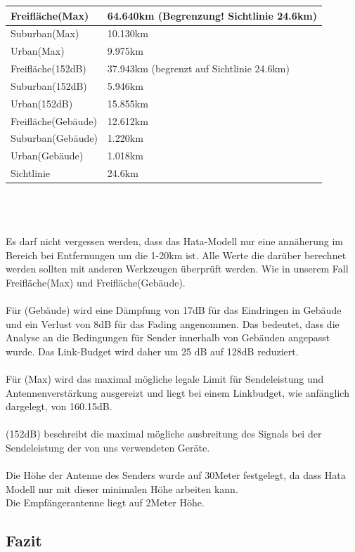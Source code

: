 \documentclass[12pt,a4paper]{article}
\begin{document}
\begin{tabular}[h]{l | l}
Freifläche(Max)  & 64.640km (Begrenzung! Sichtlinie 24.6km) \\
\hline
Suburban(Max) & 10.130km \\
\hline
Urban(Max) & 9.975km\\
\hline
\hline
\hline
Freifläche(152dB) & 37.943km (begrenzt auf Sichtlinie 24.6km) \\
\hline
Suburban(152dB) & 5.946km \\
\hline
Urban(152dB) & 15.855km \\
\hline
\hline
\hline
Freifläche(Gebäude) & 12.612km\\
\hline
Suburban(Gebäude) & 1.220km\\
\hline
Urban(Gebäude) & 1.018km\\
\hline
\hline
\hline
Sichtlinie & 24.6km
\end{tabular} \\ \\ 
\\
Es darf nicht vergessen werden, dass das Hata-Modell nur eine annäherung im Bereich bei Entfernungen um die 1-20km ist. Alle Werte die darüber berechnet werden sollten mit anderen Werkzeugen überprüft werden. Wie in unserem Fall Freifläche(Max) und Freifläche(Gebäude).\\
  \\
Für (Gebäude) wird eine Dämpfung von 17dB für das Eindringen in Gebäude und ein Verlust von 8dB für das Fading angenommen. Das bedeutet, dass die Analyse an die Bedingungen für Sender innerhalb von Gebäuden angepasst wurde. Das Link-Budget wird daher um 25 dB auf 128dB reduziert.\\
\\
Für (Max) wird das maximal mögliche legale Limit für Sendeleistung und Antennenverstärkung ausgereizt und liegt bei einem Linkbudget, wie anfänglich dargelegt, von 160.15dB.\\
\\
(152dB) beschreibt die maximal mögliche ausbreitung des Signals bei der Sendeleistung der von uns verwendeten Geräte.\\
\\
Die Höhe der Antenne des Senders wurde auf 30Meter festgelegt, da dass Hata Modell nur mit dieser minimalen Höhe arbeiten kann.  \\
Die Empfängerantenne liegt auf 2Meter Höhe.

\subsection{Fazit}
\end{document}
